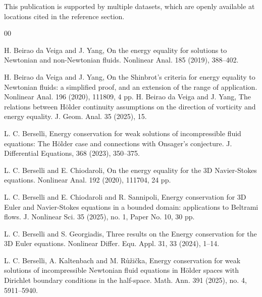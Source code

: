 \documentclass[11pt]{article}
\theoremstyle{plain}\newtheorem{definition}{Definition}[section]
\theoremstyle{definition}\newtheorem{theorem}{Theorem}[section]
\theoremstyle{plain}\newtheorem{lemma}[theorem]{Lemma}
\theoremstyle{plain}\newtheorem{coro}[theorem]{Corollary}
\theoremstyle{plain}\newtheorem{prop}[theorem]{Proposition}
\theoremstyle{remark}\newtheorem{remark}{Remark}[section]
\numberwithin{equation}{section}
\begin{document}
This publication is supported by multiple datasets, which are openly available at locations cited in the reference section.
\begin{thebibliography}{00}














\bibitem{[BY2]}
H. Beirao da Veiga and  J. Yang,   On the energy equality for solutions to Newtonian and non-Newtonian fluids. Nonlinear Anal. 185 (2019), 388--402.




\bibitem{[BY]}H. Beirao da Veiga and J. Yang, On the Shinbrot's criteria for energy equality to Newtonian fluids: a simplified proof, and an extension of the range of application. Nonlinear Anal. 196 (2020), 111809, 4 pp.
\bibitem{[BY2]}H. Beirao da Veiga and J. Yang, The relations between H\"older continuity assumptions
on the direction of vorticity and energy equality. J. Geom. Anal. 35 (2025), 15.




\bibitem{[Berselli2]} L. C. Berselli, Energy conservation for weak solutions of incompressible fluid equations:
The H\"older case and connections with Onsager's conjecture. J. Differential Equations,
368 (2023), 350--375.



\bibitem{[BC]}
L. C. Berselli and  E. Chiodaroli,  On the energy equality for the 3D Navier-Stokes
equations. Nonlinear Anal. 192 (2020), 111704, 24 pp.

\bibitem{[BCS]}
L. C. Berselli and  E. Chiodaroli and R. Sannipoli, Energy conservation for 3D Euler and Navier-Stokes equations in a bounded domain: applications to Beltrami flows. J. Nonlinear Sci. 35 (2025), no. 1, Paper No. 10, 30 pp.

\bibitem{[BG]} L. C. Berselli and S.  Georgiadis,  Three results on the Energy conservation for the 3D
Euler equations.  Nonlinear Differ. Equ. Appl. 31, 33 (2024), 1--14.


\bibitem{[BKR]}
L. C. Berselli, A. Kaltenbach and M. R\r{u}\v{z}i\v{c}ka, Energy conservation for weak solutions of incompressible Newtonian fluid equations in H\"older spaces with Dirichlet boundary conditions in the half-space. Math. Ann. 391 (2025), no. 4, 5911--5940.



\end{thebibliography}
\end{document}
